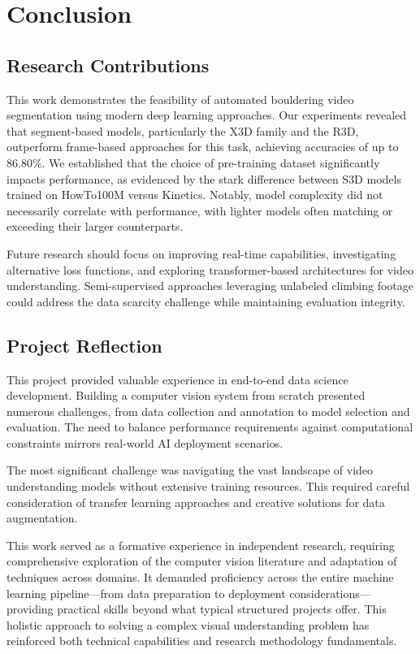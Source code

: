 \newpage
\section{Conclusion}

\subsection*{Research Contributions}
This work demonstrates the feasibility of automated bouldering video segmentation using modern deep learning approaches. Our experiments revealed that segment-based models, particularly the X3D family and the R3D, outperform frame-based approaches for this task, achieving accuracies of up to 86.80\%. We established that the choice of pre-training dataset significantly impacts performance, as evidenced by the stark difference between S3D models trained on HowTo100M versus Kinetics. Notably, model complexity did not necessarily correlate with performance, with lighter models often matching or exceeding their larger counterparts.

Future research should focus on improving real-time capabilities, investigating alternative loss functions, and exploring transformer-based architectures for video understanding. Semi-supervised approaches leveraging unlabeled climbing footage could address the data scarcity challenge while maintaining evaluation integrity.

\subsection*{Project Reflection}
This project provided valuable experience in end-to-end data science development. Building a computer vision system from scratch presented numerous challenges, from data collection and annotation to model selection and evaluation. The need to balance performance requirements against computational constraints mirrors real-world AI deployment scenarios.

The most significant challenge was navigating the vast landscape of video understanding models without extensive training resources. This required careful consideration of transfer learning approaches and creative solutions for data augmentation.

This work served as a formative experience in independent research, requiring comprehensive exploration of the computer vision literature and adaptation of techniques across domains. It demanded proficiency across the entire machine learning pipeline—from data preparation to deployment considerations—providing practical skills beyond what typical structured projects offer. This holistic approach to solving a complex visual understanding problem has reinforced both technical capabilities and research methodology fundamentals.